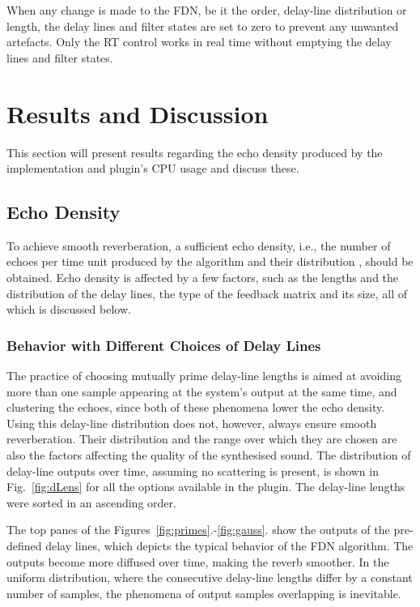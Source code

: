 \documentclass[twoside,a4paper]{article}
\begin{document}
When any change is made to the FDN, be it the order, delay-line distribution or length, the delay lines and filter states are set to zero to prevent any unwanted artefacts. Only the RT control works in real time without emptying the delay lines and filter states.

\section{Results and Discussion}\label{sec:resDisc}

This section will present results regarding the echo density produced by the implementation and plugin's CPU usage and discuss these.

\subsection{Echo Density}
To achieve smooth reverberation, a sufficient echo density, i.e., the number of echoes per time unit produced by the algorithm and their distribution \cite{schlecht:2016:echo}, should be obtained. Echo density is affected by a few factors, such as the lengths and the distribution of the delay lines, the type of the feedback matrix and its size, all of which is discussed below.

\subsubsection{Behavior with Different Choices of Delay Lines}
The practice of choosing mutually prime delay-line lengths is aimed at avoiding more than one sample appearing at the system's output at the same time, and clustering the echoes, since both of these phenomena lower the echo density. Using this delay-line distribution does not, however, always ensure smooth reverberation. Their distribution and the range over which they are chosen are also the factors affecting the quality of the synthesised sound. The distribution of delay-line outputs over time, assuming no scattering is present, is shown in Fig.~\ref{fig:dLens} for all the options available in the plugin. The delay-line lengths were sorted in an ascending order.

The top panes of the Figures~\ref{fig:primes}.-\ref{fig:gauss}. show the outputs of the pre-defined delay lines, which depicts the typical behavior of the FDN algorithm. The outputs become more diffused over time, making the reverb smoother. In the uniform distribution, where the consecutive delay-line lengths differ by a constant number of samples, the phenomena of output samples overlapping is inevitable. 
\end{document}
